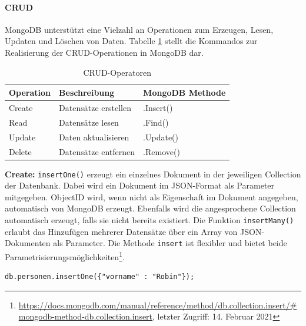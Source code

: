 \paragraph{CRUD}
MongoDB unterstützt eine Vielzahl an Operationen zum Erzeugen, Lesen, Updaten und Löschen von Daten.
Tabelle \ref{CRUDOperatoren} stellt die Kommandos zur Realisierung der CRUD-Operationen in MongoDB dar.
\newline

\begin{table}[tbt]
\caption{CRUD-Operatoren}
\label{CRUDOperatoren}
\begin{center}
    \begin{tabular}{ l  p{8cm}  l }
    \toprule
    \textbf{Operation} & \textbf{Beschreibung} & \textbf{MongoDB Methode} \\
    \midrule

    Create & Datensätze erstellen & .Insert() \\

	Read & Datensätze lesen & .Find() \\

    Update & Daten aktualisieren & .Update() \\ 

    Delete & Datensätze entfernen & .Remove()  \\ 
    \bottomrule
    \end{tabular}
\end{center}
\end{table}

\noindent
{}
\textbf{Create:}
\texttt{insertOne()} erzeugt ein einzelnes Dokument in der jeweiligen Collection der Datenbank. Dabei wird ein Dokument im JSON-Format als Parameter mitgegeben. ObjectID wird, wenn nicht als Eigenschaft im Dokument angegeben, automatisch von MongoDB erzeugt. Ebenfalls wird die angesprochene Collection automatisch erzeugt, falls sie nicht bereits existiert. Die Funktion \texttt{insertMany()}  erlaubt das Hinzufügen mehrerer Datensätze über ein Array von JSON-Dokumenten als Parameter. Die Methode \texttt{insert} ist flexibler und bietet beide Parametrisierungsmöglichkeiten\footnote{\url{https://docs.mongodb.com/manual/reference/method/db.collection.insert/\#mongodb-method-db.collection.insert}, letzter Zugriff: 14. Februar 2021}.
\newline
\begin{lstlisting}[caption=MongoDB Create, label=lst:MongoDBCreate]
db.personen.insertOne({"vorname" : "Robin"});
\end{lstlisting}

